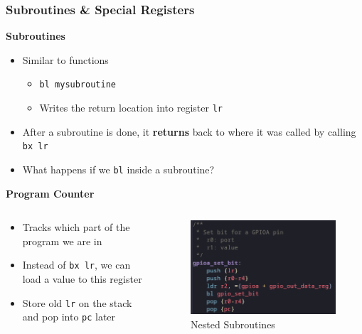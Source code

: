 \documentclass{beamer}
\begin{document}
\begin{frame}
	\frametitle{Subroutines \& Special Registers}
	\textbf{Subroutines}
    \begin{itemize}
        \item Similar to functions
		\begin{itemize}
			\item \texttt{bl mysubroutine}
			\item Writes the return location into register \texttt{lr}
		\end{itemize}
		\item After a subroutine is done, it \textbf{returns} back to where it was called by calling \texttt{bx lr}
		\item What happens if we \texttt{bl} inside a subroutine?
    \end{itemize}
    \textbf{Program Counter}
    \begin{columns}
        \begin{column}{0.55\textwidth}
			\begin{itemize}
				\item Tracks which part of the program we are in
				\item Instead of \texttt{bx lr}, we can load a value to this register
				\item Store old \texttt{lr} on the stack and pop into \texttt{pc} later
			\end{itemize}
        \end{column}
        \begin{column}{0.4\textwidth}
			\begin{figure}
				\centering
				\includegraphics[width=\textwidth]{images/nested_subroutine.png}
				\caption{\small Nested Subroutines}
			\end{figure}
        \end{column}
    \end{columns}
\end{frame}
\end{document}
